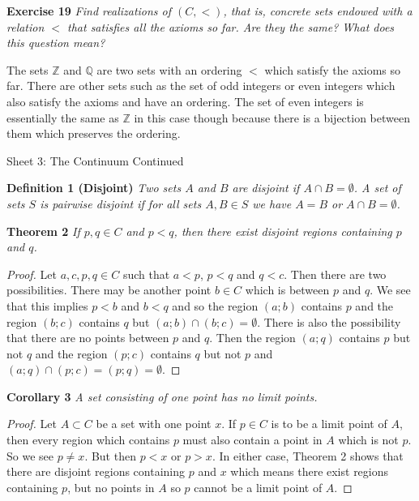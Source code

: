\documentclass{article}
\begin{document}
\begin{flushleft}
\textbf{Exercise 19}
\textsl{Find realizations of $(C, <)$, that is, concrete sets endowed with a relation $<$ that satisfies all the axioms so far. Are they the same? What does this question mean?}\newline

The sets $\mathbb{Z}$ and $\mathbb{Q}$ are two sets with an ordering $<$ which satisfy the axioms so far. There are other sets such as the set of odd integers or even integers which also satisfy the axioms and have an ordering. The set of even integers is essentially the same as $\mathbb{Z}$ in this case though because there is a bijection between them which preserves the ordering.

\newpage

\Large

Sheet 3: The Continuum Continued\newline

\normalsize

\textbf{Definition 1 (Disjoint)}
\textsl{Two sets $A$ and $B$ are disjoint if $A \cap B = \emptyset$. A set of sets $S$ is pairwise disjoint if for all sets $A,B \in S$ we have $A=B$ or $A \cap B = \emptyset$.}\newline

\textbf{Theorem 2}
\textsl{If $p,q \in C$ and $p<q$, then there exist disjoint regions containing $p$ and $q$.}
\begin{proof}
Let $a,c,p,q \in C$ such that $a<p$, $p<q$ and $q<c$. Then there are two possibilities. There may be another point $b \in C$ which is between $p$ and $q$. We see that this implies $p<b$ and $b<q$ and so the region $(a;b)$ contains $p$ and the region $(b;c)$ contains $q$ but $(a;b) \cap (b;c) = \emptyset$. There is also the possibility that there are no points between $p$ and $q$. Then the region $(a;q)$ contains $p$ but not $q$ and the region $(p;c)$ contains $q$ but not $p$ and $(a;q) \cap (p;c) = (p;q) = \emptyset$.
\end{proof}

\textbf{Corollary 3}
\textsl{A set consisting of one point has no limit points.}
\begin{proof}
Let $A \subset C$ be a set with one point $x$. If $p \in C$ is to be a limit point of $A$, then every region which contains $p$ must also contain a point in $A$ which is not $p$. So we see $p \neq x$. But then $p<x$ or $p>x$. In either case, Theorem 2 shows that there are disjoint regions containing $p$ and $x$ which means there exist regions containing $p$, but no points in $A$ so $p$ cannot be a limit point of $A$.
\end{proof}


\end{flushleft}
\end{document}
